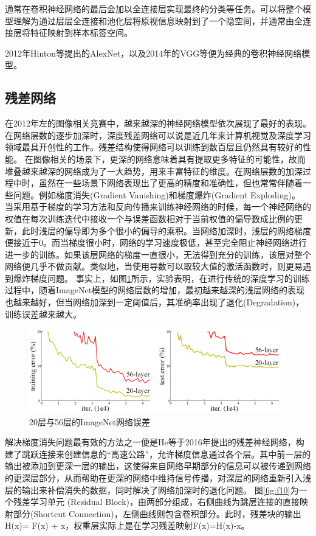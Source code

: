 通常在卷积神经网络的最后会加以全连接层实现最终的分类等任务。可以将整个模型理解为通过层层全连接和池化层将原视信息映射到了一个隐空间，并通常由全连接层将特征映射到样本标签空间。

2012年Hinton等提出的AlexNet，以及2014年的VGG等便为经典的卷积神经网络模型。



\subsection{残差网络}{}

在2012年左的图像相关竞赛中，越来越深的神经网络模型依次展现了最好的表现。在网络层数的逐步加深时，深度残差网络可以说是近几年来计算机视觉及深度学习领域最具开创性的工作。残差结构使得网络可以训练到数百层且仍然具有较好的性能。
在图像相关的场景下，更深的网络意味着具有提取更多特征的可能性，故而堆叠越来越深的网络成为了一大趋势，用来丰富特征的维度。在网络层数的加深过程中时，虽然在一些场景下网络表现出了更高的精度和准确性，但也常常伴随着一些问题。例如梯度消失(Gradient Vanishing)和梯度爆炸(Gradient Exploding)。
当采用基于梯度的学习方法和反向传播来训练神经网络的时候，每一个神经网络的权值在每次训练迭代中接收一个与误差函数相对于当前权值的偏导数成比例的更新，此时浅层的偏导即为多个很小的偏导的乘积。当网络加深时，浅层的网络梯度便接近于0。而当梯度很小时，网络的学习速度极低，甚至完全阻止神经网络进行进一步的训练。如果该层网络的梯度一直很小，无法得到充分的训练，该层对整个网络便几乎不做贡献。类似地，当使用导数可以取较大值的激活函数时，则更易遇到爆炸梯度问题。
事实上，如图\ref{fig:f9}所示，实验表明，在进行传统的深度学习的训练过程中，随着ImageNet模型的网络层数的增加，最初越来越深的浅层网络的表现也越来越好，但当网络加深到一定阈值后，其准确率出现了退化(Degradation)，训练误差越来越大。

\begin{figure}[h]
	\centering
	\includegraphics[scale=1]{figures/9.png}
	\caption{20层与56层的ImageNet网络误差}
	\label{fig:f9}
\end{figure}

解决梯度消失问题最有效的方法之一便是He等于2016年提出的残差神经网络，构建了跳跃连接来创建信息的“高速公路”，允许梯度信息通过各个层。其中前一层的输出被添加到更深一层的输出，这使得来自网络早期部分的信息可以被传递到网络的更深层部分，从而帮助在更深的网络中维持信号传播，对深层的网络重新引入浅层的输出来补偿消失的数据，同时解决了网络加深时的退化问题。
图\ref{fig:f10}为一个残差学习单元 (Residual Block)，由两部分组成，右侧曲线为跳层连接的直接映射部分(Shortcut Connection)，左侧曲线则包含卷积部分。此时，残差块的输出H(x)= F(x) + x，权重层实际上是在学习残差映射F(x)=H(x)-x。

